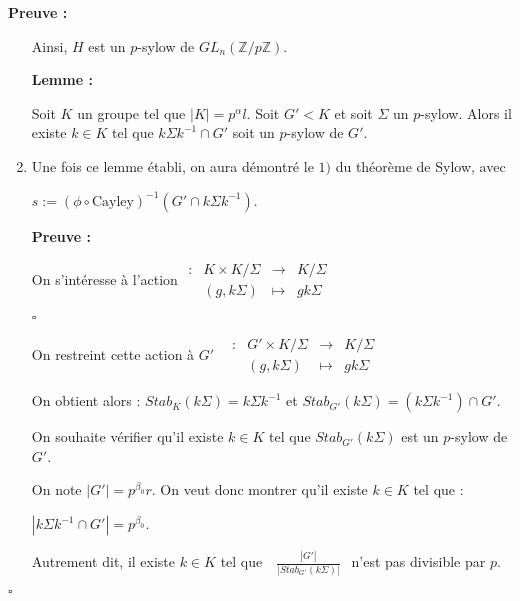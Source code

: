 \documentclass{report}
\renewenvironment{leftbar}{%
  \def\FrameCommand{\vrule width 0.4pt \hspace{10pt}}%
  \MakeFramed {\advance\hsize-\width \FrameRestore}}%
 {\endMakeFramed}%
\newenvironment{preuve}{\vspace*{0.5cm}
    \begin{leftbar}
    \noindent\textbf{Preuve :}\par}{
    \begin{flushright}
    $\square$
    \end{flushright}
    \end{leftbar}
}
\newenvironment{lemme}[2][white]{\begin{tcolorbox}[colframe= #1]
    \textbf{Lemme :} #2  \par}
    {\end{tcolorbox}}
\newcommand{\fonction}[5]{
    \begin{array}{l|rcl}
    #1: & #2 & \longrightarrow & #3 \\
        & #4 & \longmapsto & #5 
    \end{array}
}
\newcommand{\Z}{\mathbb{Z}}
\begin{document}
\begin{preuve}
\begin{enumerate}
            \bigbreak Ainsi, $H$ est un $p$-sylow de $GL_n(\Z / p\Z) .$
            
            \begin{lemme}{}
                Soit $K$ un groupe tel que $|K| = p^\alpha l$. Soit $G'<K$ et soit $\Sigma $ un $p$-sylow. Alors il existe $k\in K$ tel que $k\Sigma k^{-1}\cap G'$ soit un $p$-sylow de $G'$.
            \end{lemme}
            
            
            \item Une fois ce lemme établi, on aura démontré le $1)$ du théorème de Sylow, avec 
            
            \begin{center}
                $s:=\left( \phi \circ \text{Cayley}\right)^{-1}\left( G' \cap k \Sigma k^{-1}\right)$.
            \end{center} 
            
            \begin{preuve}
                On s'intéresse à l'action $\fonction{}{K\times K/\Sigma}{K/\Sigma}{(g,k\Sigma)}{gk\Sigma}$
            \end{preuve}
            
            On restreint cette action à $G'~~~~\fonction{}{G'\times K/\Sigma}{K/\Sigma}{(g, k\Sigma)}{gk\Sigma}$
            
            \bigbreak
            
            On obtient alors : $Stab_K(k\Sigma)=k\Sigma k^{-1}$ et $Stab_{G'}(k\Sigma)=(k\Sigma k^{-1})\cap G'$. 
            
            \newline 
            
            On souhaite vérifier qu'il existe $k \in K$ tel que $Stab_{G'}(k\Sigma)$ est un $p$-sylow de $G'$. 
            
            \bigbreak On note $|G'|=p^{\beta_0 }r$. On veut donc montrer qu'il existe $k\in K$ tel que :
            
            \begin{center}
                 $|k\Sigma k^{-1}\cap G'|=p^{\beta _ 0}$.
            \end{center}
            
            Autrement dit, il existe $k \in K$ tel que $~~~\frac{|G'|}{|Stab_{G'}(k\Sigma)|}~~$ n'est pas divisible par $p.$
            
            \newline 
            

\end{enumerate}
\end{preuve}
\end{document}
